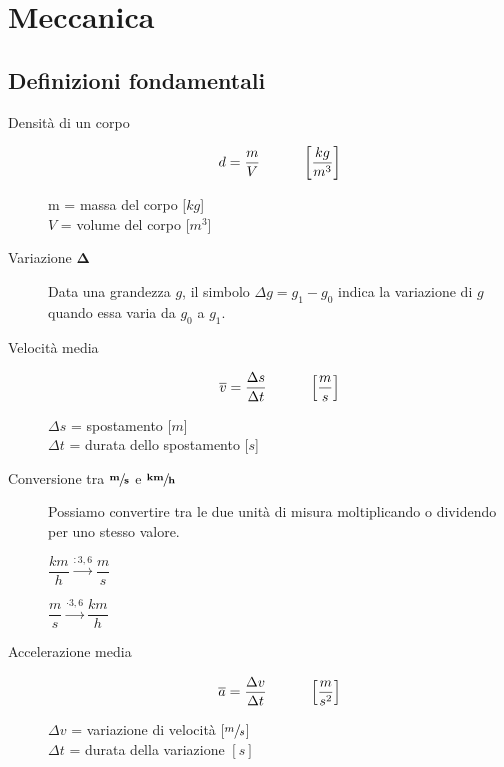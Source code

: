 \documentclass[a4paper,11pt,italian]{article}
\begin{document}
\newpage
\section{Meccanica}

\subsection{Definizioni fondamentali}

\begin{description}
  \item[Densità di un corpo] 
  \[ d = \frac{m}{V} \hspace*{3em} \left[ \frac{kg}{m^3} \right] \]
  \begin{multicols}{2}
  m = massa del corpo [$ kg $]\\
  $ V $ = volume del corpo [$ m^3 $]
  \end{multicols}
  
  \item[Variazione $ \mathbf{\Delta} $] 
  Data una grandezza $ g $, il simbolo $ \Delta g = g_1 - g_0 $ indica la variazione di $ g $ quando essa varia da $ g_0 $ a $ g_1 $.
  
  \item[Velocità media]
  \[ \overline{v} = \frac{\Delta s}{\Delta t} \hspace*{3em} \left[ \frac{m}{s} \right] \]
  \begin{multicols}{2}
  $ \Delta s $ = spostamento [$ m $]\\
  $ \Delta t $ = durata dello spostamento [$ s $]
  \end{multicols}
  
  \item[Conversione tra $ \sfrac{\mathbf{m}}{\mathbf{s}} $ e $ \sfrac{\mathbf{km}}{\mathbf{h}} $] 
  Possiamo convertire tra le due unità di misura moltiplicando o dividendo per uno stesso valore.
  \begin{multicols}{2}\begin{center}
  $ \dfrac{km}{h} \xrightarrow{: 3,6} \dfrac{m}{s} $
   
  $ \dfrac{m}{s} \xrightarrow{\cdot 3,6} \dfrac{km}{h} $
  \end{center}\end{multicols}
  
  \item[Accelerazione media] 
  \[ \overline{a} = \frac{\Delta v}{\Delta t} \hspace*{3em} \left[ \frac{m}{s^2} \right]  \]
  \begin{multicols}{2}
  $ \Delta v $ = variazione di velocità [$ \sfrac{m}{s}$]\\
  $ \Delta t $ = durata della variazione $ [s] $
  \end{multicols}
  

\end{description}
\end{document}
